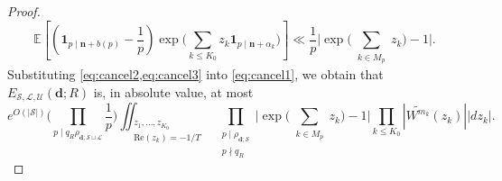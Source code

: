 \documentclass[11pt]{amsart}
\theoremstyle{definition}
\renewcommand{\leq}{\leqslant}
\renewcommand{\Re}{\mathrm{Re}}
\newcommand{\abs}[1]{\left|#1\right|}
\newcommand{\ind}[1]{\mathbf{1}_{#1}}
\renewcommand{\d}{\boldsymbol{d}}
\newcommand{\n}{\mathbf{n}}
\newcommand{\sommespart}{b}
\newcommand{\fprod}[1]{\rho_{#1}}
\newcommand{\lit}{\mathcal{L}}
\newcommand{\unlit}{\mathcal{U}}
\newcommand{\s}{\mathcal{S}}
\newcommand{\modulus}{q}
\newcommand{\insingleproof}{M}
\newcommand{\otherL}{T}
\newcommand{\littleh}{k}
\begin{document}
\begin{proof}
\begin{equation}
\label{eq:cancel3}
\mathbb{E} \left[\left(\ind{p \mid \n+\sommespart(p)} - \frac{1}{p}\right) \exp \bigg(\sum_{\littleh \leq K_0} z_{\littleh} \ind{p\mid \n + \alpha_{\littleh}}\bigg) \right] \ll \frac{1}{p} \Bigg|\exp \bigg(\sum_{\substack{\littleh \in \insingleproof_p} }z_{\littleh}\bigg)-1\Bigg|.
\end{equation}
Substituting \cref{eq:cancel2,eq:cancel3} into \cref{eq:cancel1}, we obtain that $E_{\s,\lit,\unlit}(\d; R)$ is, in absolute value, at most 
\begin{equation}
\label{eq:remainingint}
e^{O(|\s|)} \Bigg(\prod_{p\mid \modulus_{R} \fprod{\d; \s \sqcup \lit}} \frac 1p\Bigg) \iint_{\substack{z_1,\dots,z_{K_0}\,\,\,\,\,\,\,\,\,\\ \Re(z_{\littleh})=-1/\otherL}}  \, \prod_{\substack{p\mid \fprod{\d; \s}\\ p\nmid \modulus_R}} \Bigg|\exp \bigg(\sum_{\substack{\littleh \in \insingleproof_p} }z_{\littleh}\bigg)-1\Bigg|   \prod_{\littleh \leq K_0} \abs{\widetilde{W^{m_{\littleh}}}(z_{\littleh})} |dz_{\littleh}|.
\end{equation}


\end{proof}
\end{document}
